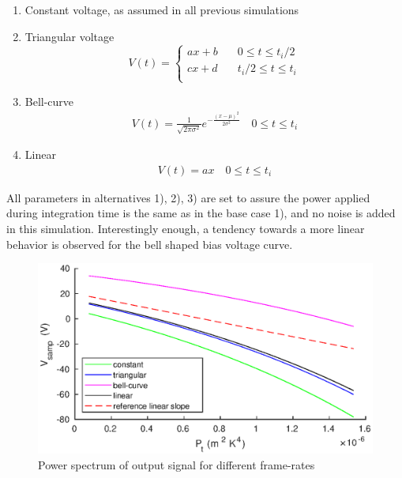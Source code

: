 \begin{enumerate}
\item Constant voltage, as assumed in all previous simulations
\item Triangular voltage
\[
V(t) =
     \begin{cases}
       ax+b &\quad 0 \leq t \leq t_{i}/2\\
       cx+d &\quad t_{i}/2 \le t \leq t_{i}\\
     \end{cases}
\]
\item Bell-curve
\begin{align*}
V(t) = \frac{1}{\sqrt{2\pi \sigma^2}} e^{-\frac{(x-\mu)^{2}}{2\sigma^{2}}} \quad 0 \leq t \leq t_{i}
\end{align*}
\item Linear
\begin{align*}
V(t) = ax \quad 0 \leq t \leq t_{i}
\end{align*}
\end{enumerate}

All parameters in alternatives 1), 2), 3) are set to assure the power applied during integration time is the same as in the base case 1), and no noise is added in this simulation. Interestingly enough, a tendency towards a more linear behavior is observed for the bell shaped bias voltage curve.

\begin{figure}[H]
 \begin{center}
\includegraphics[scale=0.9]{gfx/out_vs_inrad.eps}
  \caption{Power spectrum of output signal for different frame-rates}
  \label{fig:out_vs_inrad}
  \end{center}
\end{figure}

